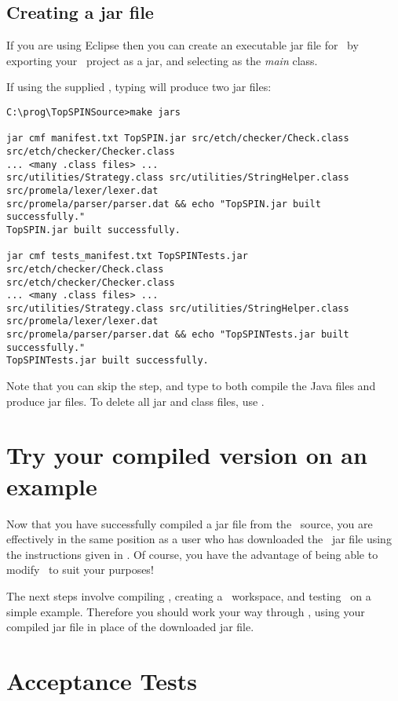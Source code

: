 \subsection{Creating a jar file}
%
If you are using Eclipse then you can create an executable jar file
for \topspin\ by exporting your \topspin\ project as a jar, and
selecting  as the \emph{main} class.

If using the supplied , typing 
will produce two jar files:
%
\begin{lstlisting}
C:\prog\TopSPINSource>make jars

jar cmf manifest.txt TopSPIN.jar src/etch/checker/Check.class src/etch/checker/Checker.class
... <many .class files> ...
src/utilities/Strategy.class src/utilities/StringHelper.class src/promela/lexer/lexer.dat
src/promela/parser/parser.dat && echo "TopSPIN.jar built successfully."
TopSPIN.jar built successfully.

jar cmf tests_manifest.txt TopSPINTests.jar src/etch/checker/Check.class
src/etch/checker/Checker.class
... <many .class files> ...
src/utilities/Strategy.class src/utilities/StringHelper.class src/promela/lexer/lexer.dat
src/promela/parser/parser.dat && echo "TopSPINTests.jar built successfully."
TopSPINTests.jar built successfully.
\end{lstlisting}
%
Note that you can skip the  step, and type
 to both compile the Java files and produce jar
files.  To delete all jar and class files, use .

\section{Try your compiled version on an example}

Now that you have successfully compiled a jar file from the
\topspin\ source, you are effectively in the same position as a user
who has downloaded the \topspin\ jar file using the instructions
given in .  Of course, you
have the advantage of being able to modify \topspin\ to suit your
purposes!

The next steps involve compiling \saucy, creating a \gap\ workspace,
and testing \topspin\ on a simple example.  Therefore you should
work your way through , using
your compiled jar file in place of the downloaded jar file.

\section{Acceptance Tests}\label{sec:compilingfromsource:testing}

